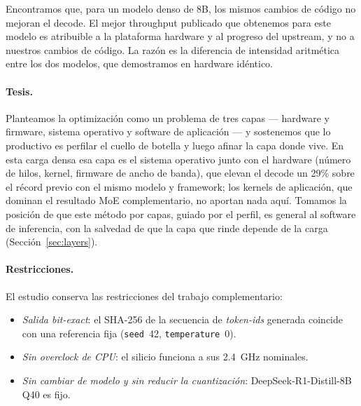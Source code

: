 \documentclass[10pt,a4paper]{article}
\begin{document}
Encontramos que, para un modelo denso de 8B, los mismos cambios de código no mejoran el decode. El mejor throughput publicado que obtenemos para este modelo es atribuible a la plataforma hardware y al progreso del upstream, y no a nuestros cambios de código. La razón es la diferencia de intensidad aritmética entre los dos modelos, que demostramos en hardware idéntico.

\paragraph{Tesis.} Planteamos la optimización como un problema de tres capas --- hardware y firmware, sistema operativo y software de aplicación --- y sostenemos que lo productivo es perfilar el cuello de botella y luego afinar la capa donde vive. En esta carga densa esa capa es el sistema operativo junto con el hardware (número de hilos, kernel, firmware de ancho de banda), que elevan el decode un 29\% sobre el récord previo con el mismo modelo y framework; los kernels de aplicación, que dominan el resultado MoE complementario, no aportan nada aquí. Tomamos la posición de que este método por capas, guiado por el perfil, es general al software de inferencia, con la salvedad de que la capa que rinde depende de la carga (Sección~\ref{sec:layers}).

\paragraph{Restricciones.} El estudio conserva las restricciones del trabajo complementario:
\begin{itemize}
  \item \emph{Salida bit-exact}: el SHA-256 de la secuencia de \emph{token-ids} generada coincide con una referencia fija (\texttt{seed}~42, \texttt{temperature}~0).
  \item \emph{Sin overclock de CPU}: el silicio funciona a sus 2.4~GHz nominales.
  \item \emph{Sin cambiar de modelo y sin reducir la cuantización}: DeepSeek-R1-Distill-8B Q40 es fijo.
\end{itemize}
\end{document}
